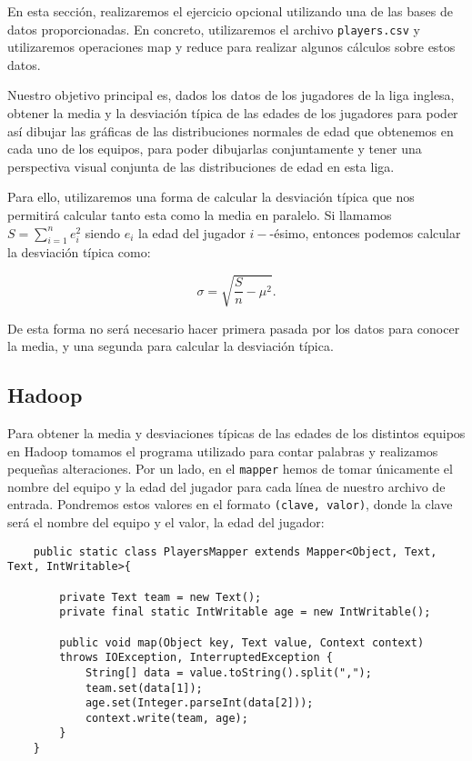 \documentclass[11pt]{article}
\def\inline{\lstinline[basicstyle=\ttfamily,keywordstyle={}]}
\begin{document}
En esta sección, realizaremos el ejercicio opcional utilizando una de las bases de datos proporcionadas. En concreto, utilizaremos el archivo \inline{players.csv} y utilizaremos operaciones map y reduce para realizar algunos cálculos sobre estos datos.

Nuestro objetivo principal es, dados los datos de los jugadores de la liga inglesa, obtener la media y la desviación típica de las edades de los jugadores para poder así dibujar las gráficas de las distribuciones normales de edad que obtenemos en cada uno de los equipos, para poder dibujarlas conjuntamente y tener una perspectiva visual conjunta de las distribuciones de edad en esta liga.

Para ello, utilizaremos una forma de calcular la desviación típica que nos permitirá calcular tanto esta como la media en paralelo. Si llamamos $S = \sum_{i=1}^n e_i^2$ siendo $e_i$ la edad del jugador $i-$-ésimo, entonces podemos calcular la desviación típica como:

\[
\sigma = \sqrt{\frac{S}{n} - \mu^2}.
\]

De esta forma no será necesario hacer primera pasada por los datos para conocer la media, y una segunda para calcular la desviación típica.

\subsection{Hadoop}

Para obtener la media y desviaciones típicas de las edades de los distintos equipos en Hadoop tomamos el programa utilizado para contar palabras y realizamos pequeñas alteraciones. Por un lado, en el \inline{mapper} hemos de tomar únicamente el nombre del equipo y la edad del jugador para cada línea de nuestro archivo de entrada. Pondremos estos valores en el formato \inline{(clave, valor)}, donde la clave será el nombre del equipo y el valor, la edad del jugador:

\begin{verbatim}
	public static class PlayersMapper extends Mapper<Object, Text, Text, IntWritable>{
		
		private Text team = new Text();
		private final static IntWritable age = new IntWritable();
		
		public void map(Object key, Text value, Context context)
		throws IOException, InterruptedException {
			String[] data = value.toString().split(",");
			team.set(data[1]);
			age.set(Integer.parseInt(data[2]));
			context.write(team, age);
		}
	}
\end{verbatim}
\end{document}
